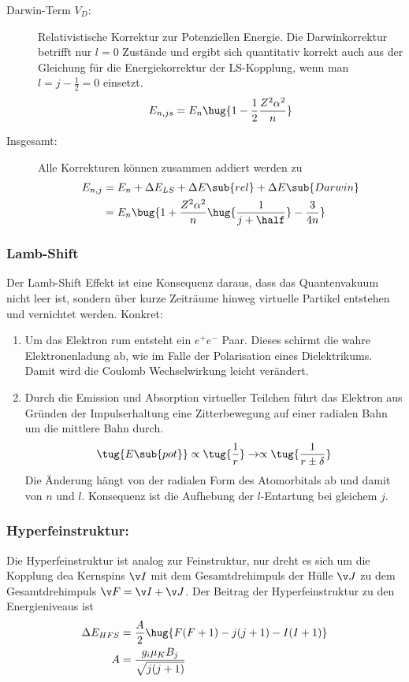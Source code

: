 \documentclass[twocolumn]{summery_4.1}
\begin{document}
\begin{description}
    \item[Darwin-Term \(V_D\):] Relativistische Korrektur zur Potenziellen Energie. Die Darwinkorrektur betrifft nur \(l=0\) Zustände und ergibt sich quantitativ korrekt auch aus der Gleichung für die Energiekorrektur der LS-Kopplung, wenn man \(l=j-\frac12 =0\) einsetzt.
    \begin{align*}
        E_{n,js} = E_n\hug{1 - \frac{1}{2}\frac{Z^2\alpha^2}{n}}
    \end{align*}

    \item[Insgesamt:] Alle Korrekturen können zusammen addiert werden zu 
    \begin{align*}
        E_{n,j} &= E_n + \Delta E_{LS} + \Delta E\sub{rel} + \Delta E\sub{Darwin}\\ 
        &= E_n \bug{1 + \frac{Z^2 \alpha^2}{n} \hug{\frac{1}{j + \half}}- \frac{3}{4n}}
    \end{align*}
\end{description}

\subsubsection{Lamb-Shift}
Der Lamb-Shift Effekt ist eine Konsequenz daraus, dass das Quantenvakuum nicht leer ist, sondern über kurze Zeiträume hinweg virtuelle Partikel entstehen und vernichtet werden. 
Konkret:
\begin{enumerate}
    \item Um das Elektron rum entsteht ein \(e^+ e^-\) Paar. Dieses schirmt die wahre Elektronenladung ab, wie im Falle der Polarisation eines Dielektrikums. Damit wird die Coulomb Wechselwirkung leicht verändert.
    \item Durch die Emission und Absorption virtueller Teilchen führt das Elektron aus Gründen der Impulserhaltung eine Zitterbewegung auf einer radialen Bahn um die mittlere Bahn durch. 
    \begin{align*}
        \tug{E\sub{pot}} \propto \tug{\frac1{r}} \to \propto \tug{\frac{1}{r\pm\delta}}
    \end{align*}
    Die Änderung hängt von der radialen Form des Atomorbitals ab und damit von $n$ und $l$. Konsequenz ist die Aufhebung der \(l\)-Entartung bei gleichem \(j\). 
\end{enumerate}

\subsubsection{Hyperfeinstruktur:}
Die Hyperfeinstruktur ist analog zur Feinstruktur, nur dreht es sich um die Kopplung dea Kernspins \(\v I\) mit dem Gesamtdrehimpuls der Hülle \(\v J\) zu dem Gesamtdrehimpuls \(\v F = \v I + \v J \).
Der Beitrag der Hyperfeinstruktur zu den Energieniveaus ist 
\begin{align*}
    \Delta E_{HFS} &= \frac A2 \hug{F(F+1) - j(j+1) - I(I+1)} \\
    A&=\frac{g_i \mu_K B_j}{\sqrt{j(j+1)}}
\end{align*}
\end{document}

